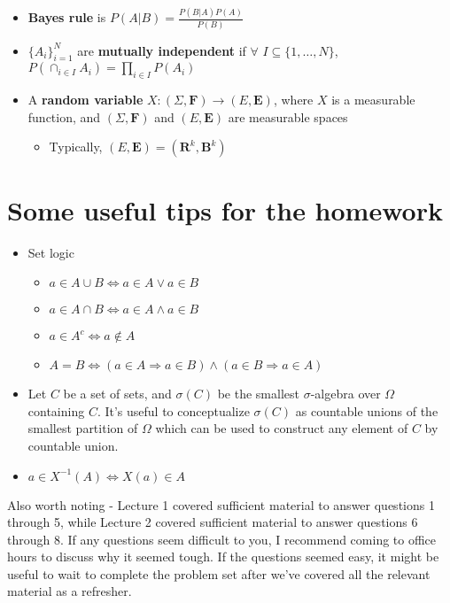 \documentclass[12pt,english]{article}
\begin{document}
\begin{itemize}
	\item \textbf{Bayes rule} is $P(A | B) = \frac{P(B | A) P(A)}{P(B)}$
	\item $\{ A_{i} \}_{i = 1}^{N}$ are \textbf{mutually independent} if $\forall$ $I \subseteq \{1, \ldots, N\}$, $P(\cap_{i \in I} A_{i}) = \prod_{i \in I} P(A_{i})$
	\item A \textbf{random variable} $X : (\Sigma, \mathbf{F}) \to (E, \mathbf{E})$, where $X$ is a measurable function, and $(\Sigma, \mathbf{F})$ and $(E, \mathbf{E})$ are measurable spaces
	\begin{itemize}
		\item Typically, $(E, \mathbf{E}) = (\mathbf{R}^{k}, \mathbf{B}^{k})$
	\end{itemize}
\end{itemize}

\section{Some useful tips for the homework}

\begin{itemize}
	\item Set logic
	\begin{itemize}
		\item $a \in A \cup B \Leftrightarrow a \in A \vee a \in B$
		\item $a \in A \cap B \Leftrightarrow a \in A \wedge a \in B$
		\item $a \in A^{c} \Leftrightarrow a \notin A$
		\item $A = B \Leftrightarrow (a \in A \Rightarrow a \in B) \wedge (a \in B \Rightarrow a \in A)$
	\end{itemize}
	\item Let $C$ be a set of sets, and $\sigma(C)$ be the smallest $\sigma$-algebra over $\Omega$ containing $C$. It's useful to conceptualize $\sigma(C)$ as countable unions of the smallest partition of $\Omega$ which can be used to construct any element of $C$ by countable union.
	\item $a \in X^{-1}(A) \Leftrightarrow X(a) \in A$
\end{itemize}

\vspace{1em}
Also worth noting - Lecture 1 covered sufficient material to answer questions 1 through 5, while Lecture 2 covered sufficient material to answer questions 6 through 8. If any questions seem difficult to you, I recommend coming to office hours to discuss why it seemed tough. If the questions seemed easy, it might be useful to wait to complete the problem set after we've covered all the relevant material as a refresher.
\end{document}
